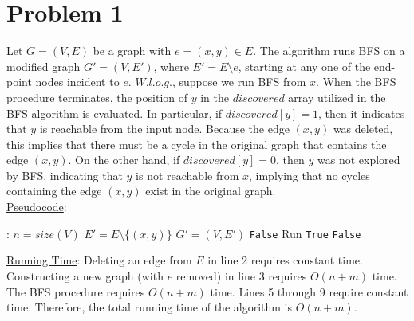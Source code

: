 \documentclass[twoside,11pt]{homework}
\date{\today}
\newcommand\NoProc{\renewcommand\algorithmicprocedure{}}
\begin{document}
\maketitle

\section*{Problem 1}
Let $G = (V, E)$ be a graph with $e = (x, y) \in E$.  The algorithm runs BFS on a modified graph $G' = (V, E')$, where $E' = E \setminus e$,  starting at any one of the end-point nodes incident to $e$.  $W.l.o.g.$,  suppose we run BFS from $x$.  When the BFS procedure terminates, the position of $y$ in the $discovered$ array utilized in the BFS algorithm is evaluated.  In particular,  if $discovered[y] = 1$, then it indicates that $y$ is reachable from the input node.  Because the edge $(x,y)$ was deleted, this implies that there must be a cycle in the original graph that contains the edge $(x, y)$.  On the other hand, if $discovered[y]=0$, then $y$ was not explored by BFS, indicating that $y$ is not reachable from $x$, implying that no cycles containing the edge $(x,y)$ exist in the original graph. \\

\noindent
\underline{Pseudocode}:
\begin{algorithm}
\begin{algorithmic}[1]
\NoProc
{}:  
\State $n = size(V)$   
\State $E' = E \setminus \{(x,y)\}$     
\State $G' = (V, E')$                             
  
\State \Return \texttt{False}   
\Else
\State Run 
\State \Return \texttt{True}
\Else 
\State \Return \texttt{False}
\EndIf
\EndIf
\EndProcedure 
\end{algorithmic}
\end{algorithm}

\noindent
\underline{Running Time}:  Deleting an edge from $E$ in line 2 requires constant time.  Constructing a new graph (with $e$ removed) in line 3 requires $O(n+m)$ time.  The BFS procedure requires $O(n+m)$ time.  Lines 5 through 9 require constant time. Therefore, the total running time of the algorithm is $O(n+m)$.  \\
\end{document}
